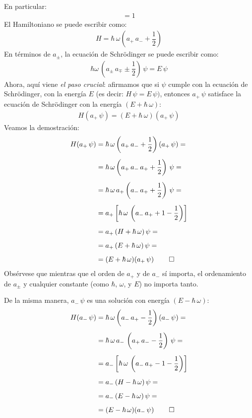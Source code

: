 En particular:
\begin{align}
[a_{-}, a_{+}] = 1
\label{eq:ecuacion_02_55}
\end{align}
El Hamiltoniano se puede escribir como:
\begin{align}
H = \hbar \, \omega \left( a_{+} \, a_{-} +\dfrac{1}{2} \right)
\label{eq:ecuacion_02_056}
\end{align}
En términos de $a_{\pm}$, la ecuación de Schrödinger se puede escribir como:
\begin{align}
\hbar \omega \, \left( a_{\pm} \, a_{\mp} \pm \dfrac{1}{2} \right) \, \psi = E \, \psi
\label{eq:ecuacion_02_057}
\end{align}
Ahora, aquí viene \emph{el paso crucial}: afirmamos que si $\psi$ cumple con la ecuación de Schrödinger, con la energía $E$ (es decir: $H \, \psi = E \, \psi)$, entonces $a_{+} \, \psi$ satisface la ecuación de Schrödinger con la energía $(E + \hbar \, \omega)$:
\begin{align*}
H (a_{+} \, \psi) = (E + \hbar \, \omega)(a_{+} \, \psi)
\end{align*}
Veamos la demostración:
\begin{align*}
H(a_{+} \, \psi) &= \hbar \, \omega \left( a_{+} \, a_{-} + \dfrac{1}{2} \right) (a_{+} \, \psi) = \\[0.5em]
&= \hbar \, \omega \left( a_{+} \, a_{-} \, a_{+} + \dfrac{1}{2} \right) \, \psi = \\[0.5em]
&= \hbar \, \omega \, a_{+} \left( a_{-} \, a_{+} + \dfrac{1}{2} \right) \, \psi = \\[0.5em]
&= a_{+} \left[ \hbar \, \omega \, \left( a_{-} \, a_{+} + 1 -  \dfrac{1}{2}  \right) \right] \\[0.5em]
&= a_{+} \, (H + \hbar \, \omega) \, \psi = \\[0.5em]
&= a_{+} \, (E + \hbar \, \omega) \, \psi =\\[0.5em]
&= (E + \hbar \, \omega)(a_{+} \, \psi) \, \qed
\end{align*}
Obsérvese que mientras que el orden de $a_{+}$ y de $a_{-}$ sí importa, el ordenamiento de $a_{\pm}$ y cualquier constante (como $\hbar$, $\omega$, y $E$) no importa tanto.
\par
De la misma manera, $a_{-} \, \psi$ es una solución con energía $(E - \hbar \, \omega)$:
\begin{align*}
H(a_{-} \, \psi) &= \hbar \, \omega \left( a_{-} \, a_{+} - \dfrac{1}{2} \right) (a_{-} \, \psi) = \\[0.5em]
&= \hbar \, \omega \, a_{-} \, \left( a_{+} \, a_{-} - \dfrac{1}{2} \right) \, \psi = \\[0.5em]
&= a_{-} \left[ \hbar \, \omega \, \left( a_{-} \, a_{+} - 1 -  \dfrac{1}{2}  \right) \right] \\[0.5em]
&= a_{-} \, (H - \hbar \, \omega) \, \psi = \\[0.5em]
&= a_{-} \, (E - \hbar \, \omega) \, \psi =\\[0.5em]
&= (E - \hbar \, \omega)(a_{-} \, \psi) \, \qed
\end{align*}
